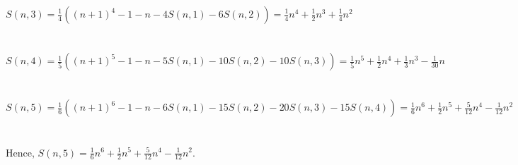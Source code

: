 \documentclass{article}
\begin{document}
$S(n,3) = \frac{1}{4}((n+1)^4 - 1 - n - 4S(n,1) - 6S(n,2)) = \frac{1}{4}n^4 + \frac{1}{2}n^3 + \frac{1}{4}n^2$\\
\\ \hspace*{\fill} \\
$S(n,4) = \frac{1}{5}((n+1)^5 - 1 - n - 5S(n,1) - 10S(n,2) - 10S(n,3)) = \frac{1}{5}n^5 + \frac{1}{2}n^4 + \frac{1}{3}n^3 - \frac{1}{30}n$\\
\\ \hspace*{\fill} \\
$S(n,5) = \frac{1}{6}((n+1)^6 - 1 - n - 6S(n,1) - 15S(n,2) - 20S(n,3) - 15S(n,4)) = \frac{1}{6}n^6 + \frac{1}{2}n^5 + \frac{5}{12}n^4 - \frac{1}{12}n^2$\\
\\ \hspace*{\fill} \\
Hence, $S(n,5) = \frac{1}{6}n^6 + \frac{1}{2}n^5 + \frac{5}{12}n^4 - \frac{1}{12}n^2$.
\end{document}
